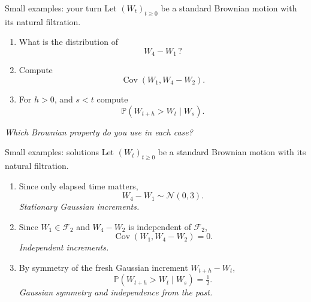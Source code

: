 \documentclass[handout,10pt,aspectratio=169]{beamer}
\newcommand{\Pp}{\mathbb P}
\newcommand{\F}{\mathcal F}
\begin{document}
\begin{frame}{Small examples: your turn}
Let \((W_t)_{t\ge0}\) be a standard Brownian motion with its natural filtration.

\begin{enumerate}\setlength{\itemsep}{1.2em}

  \item What is the distribution of
  \[
  W_4-W_1 \, ?
  \]

  \item Compute
  \[
  \operatorname{Cov}(W_1,W_4-W_2).
  \]

  \item For \(h>0\), and $s< t $ compute
  \[
  \Pp(W_{t+h}>W_t\mid W_s).
  \]

\end{enumerate}

\vfill
\centering
\textit{Which Brownian property do you use in each case?}

\end{frame}


\begin{frame}{Small examples: solutions}
Let \((W_t)_{t\ge0}\) be a standard Brownian motion with its natural filtration.

\begin{enumerate}\setlength{\itemsep}{0.75em}

  \item Since only elapsed time matters,
  \[
  \boxed{W_4-W_1\sim\mathcal N(0,3).}
  \]
  \textit{Stationary Gaussian increments.}

  \item Since \(W_1\in\F_2\) and \(W_4-W_2\) is independent of \(\F_2\),
  \[
  \boxed{\operatorname{Cov}(W_1,W_4-W_2)=0.}
  \]
  \textit{Independent increments.}

  \item By symmetry of the fresh Gaussian increment \(W_{t+h}-W_t\),
  \[
  \boxed{\Pp(W_{t+h}>W_t\mid W_s)=\tfrac12.}
  \]
  \textit{Gaussian symmetry and independence from the past.}

\end{enumerate}

\end{frame}
\end{document}
